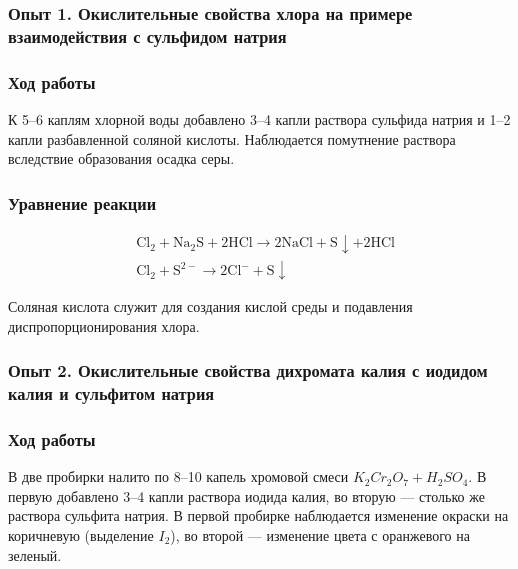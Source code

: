 \documentclass[a4paper,12pt]{article}
\begin{document}
	
	\subsubsection*{Опыт 1. Окислительные свойства хлора на примере взаимодействия с сульфидом натрия}
	
	\subsubsection*{Ход работы}
	
	\quad К 5–6 каплям хлорной воды добавлено 3–4 капли раствора сульфида натрия и 1–2 капли разбавленной соляной кислоты. Наблюдается помутнение раствора вследствие образования осадка серы.
	
	\subsubsection*{Уравнение реакции}
	\begin{align*}
		& \text{Cl}_2 + \text{Na}_2\text{S} + 2\text{HCl} \rightarrow 2\text{NaCl} + \text{S} \downarrow + 2\text{HCl} \\
		& \text{Cl}_2 + \text{S}^{2-} \rightarrow 2\text{Cl}^- + \text{S} \downarrow
	\end{align*}
	
	\quad Соляная кислота служит для создания кислой среды и подавления диспропорционирования хлора.
	
	\subsubsection*{Опыт 2. Окислительные свойства дихромата калия с иодидом калия и сульфитом натрия}
	
	\subsubsection*{Ход работы}
	
	\quad В две пробирки налито по 8–10 капель хромовой смеси \(K_2Cr_2O_7 + H_2SO_4\). В первую добавлено 3–4 капли раствора иодида калия, во вторую — столько же раствора сульфита натрия. В первой пробирке наблюдается изменение окраски на коричневую (выделение \(I_2\)), во второй — изменение цвета с оранжевого на зеленый.
	
\end{document}
